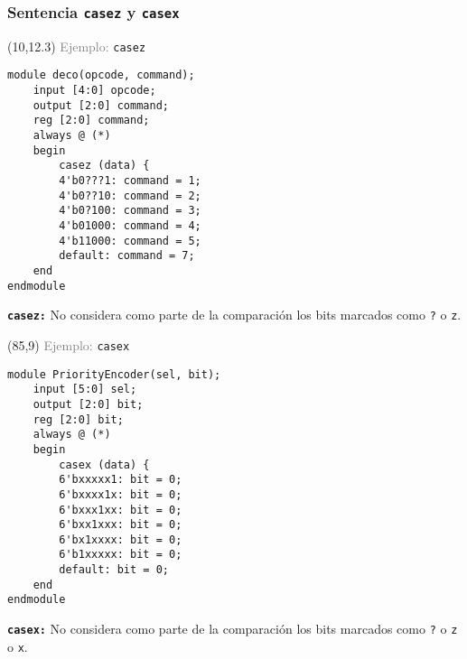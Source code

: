 \documentclass[aspectratio=169]{beamer}
\begin{document}
\begin{frame}[fragile,t]
    \frametitle{Sentencia \texttt{casez} y \texttt{casex}}
    \begin{textblock}{64}(10,12.3)
    \textcolor{gray}{Ejemplo:} \texttt{casez}\\
\lstset{basicstyle=\scriptsize}
\begin{lstlisting}
module deco(opcode, command);
    input [4:0] opcode;
    output [2:0] command;
    reg [2:0] command;
    always @ (*)
    begin
        casez (data) {
        4'b0???1: command = 1;
        4'b0??10: command = 2;
        4'b0?100: command = 3;
        4'b01000: command = 4;
        4'b11000: command = 5;
        default: command = 7;
    end
endmodule
\end{lstlisting}
    \small
    \textcolor{naranjauca}{\texttt{\textbf{casez:}}} No considera como parte de la comparación los bits marcados como \texttt{?} o \texttt{z}.
    \end{textblock}
    \begin{textblock}{64}(85,9)
    \textcolor{gray}{Ejemplo:} \texttt{casex}\\
\lstset{basicstyle=\scriptsize}
\begin{lstlisting}
module PriorityEncoder(sel, bit);
    input [5:0] sel;
    output [2:0] bit;
    reg [2:0] bit;
    always @ (*)
    begin
        casex (data) {
        6'bxxxxx1: bit = 0;
        6'bxxxx1x: bit = 0;
        6'bxxx1xx: bit = 0;
        6'bxx1xxx: bit = 0;
        6'bx1xxxx: bit = 0;
        6'b1xxxxx: bit = 0;
        default: bit = 0;
    end
endmodule
\end{lstlisting}
    \small
    \textcolor{naranjauca}{\texttt{\textbf{casex:}}} No considera como parte de la comparación los bits marcados como \texttt{?} o \texttt{z} o \texttt{x}.
    \end{textblock}
\end{frame}
\end{document}
